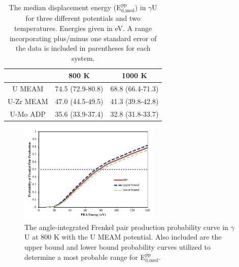 \documentclass[review]{elsarticle}
\providecommand{\DIFaddtex}[1]{{\protect\color{blue} \sf #1}} %
\providecommand{\DIFaddbegin}{} %
\providecommand{\DIFaddend}{} %
\providecommand{\DIFaddFL}[1]{\DIFadd{#1}} %
\providecommand{\DIFaddbeginFL}{} %
\providecommand{\DIFaddendFL}{} %
\providecommand{\DIFadd}[1]{\texorpdfstring{\DIFaddtex{#1}}{#1}} %
\newcommand{\DIFaddincludegraphics}[2][]{{\color{blue}\fbox{\DIFOincludegraphics[#1]{#2}}}} %
\DeclareRobustCommand{\DIFaddbegin}{\DIFOaddbegin \let\includegraphics\DIFaddincludegraphics} %
\DeclareRobustCommand{\DIFaddend}{\DIFOaddend \let\includegraphics\DIFOincludegraphics} %
\DeclareRobustCommand{\DIFaddbeginFL}{\DIFOaddbeginFL \let\includegraphics\DIFaddincludegraphics} %
\DeclareRobustCommand{\DIFaddendFL}{\DIFOaddendFL \let\includegraphics\DIFOincludegraphics} %
\begin{document}
\DIFaddend \begin{table}[h]
\caption{The median displacement energy \DIFaddbeginFL \DIFaddFL{(E$^{\textrm{pp}}_{\textrm{d,med}}$) }\DIFaddendFL in $\gamma$U for three different potentials and two temperatures. Energies given in eV. A range incorporating plus/minus one standard error \DIFaddbeginFL \DIFaddFL{of the data }\DIFaddendFL is included in parentheses for each system.} \label{tab:gam}
\begin{center}
\begin{tabular}{|c|c|c|}
	\hline
	& 800 K & 1000 K \\
	 \hline
	 U MEAM & 74.5 (72.9-80.8) & 68.8 (66.4-71.3) \\
	 U-Zr MEAM & 47.0 (44.5-49.5) & 41.3 (39.8-42.8) \\
	 U-Mo ADP & 35.6 (33.9-37.4) & 32.8 (31.8-33.7) \\
	 \hline
\end{tabular}
\end{center}
\label{default}
\end{table}

\DIFaddbegin \begin{figure}[h]
 \centering
 \includegraphics[width=0.6\textwidth]{plus_minus.png} 
 \caption{\DIFaddFL{The angle-integrated Frenkel pair production probability curve in $\gamma$U at 800 K with the U MEAM potential. Also included are the upper bound and lower bound probability curves utilized to determine a most probable range for E$^{\textrm{pp}}_{\textrm{d,med}}$.}}
 \label{fig:errs}
\end{figure}



\DIFaddend \FloatBarrier
\end{document}
